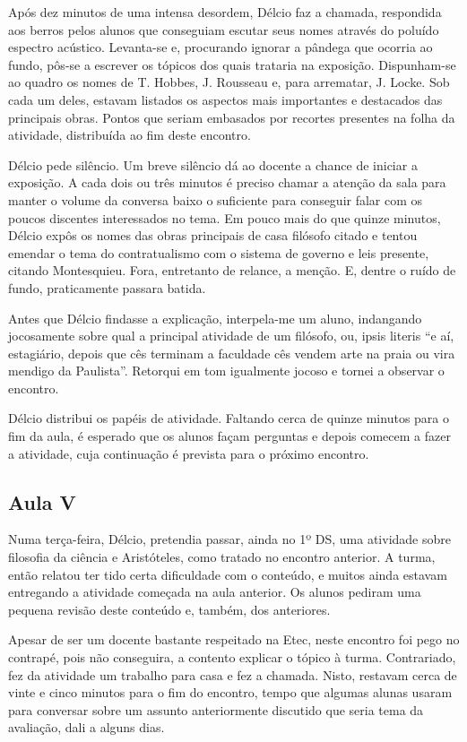 \documentclass[12pt,a4paper]{article}
\begin{document}
	Após dez minutos de uma intensa desordem, Délcio faz a chamada, respondida 
	aos berros pelos alunos que conseguiam escutar seus nomes através do 
	poluído espectro acústico. Levanta-se e, procurando ignorar a pândega que 
	ocorria ao fundo, pôs-se a escrever os tópicos dos quais trataria na 
	exposição. Dispunham-se ao quadro os nomes de T. Hobbes, J. Rousseau e, 
	para arrematar, J. Locke. Sob cada um deles, estavam listados os aspectos 
	mais importantes e destacados das principais obras. Pontos que seriam 
	embasados por recortes presentes na folha da atividade, distribuída ao 
	fim deste encontro. 
	
	Délcio pede silêncio. Um breve silêncio dá ao docente a chance de iniciar 
	a exposição. A cada dois ou três minutos é preciso chamar a atenção da 
	sala para manter o volume da conversa baixo o suficiente para conseguir 
	falar com os poucos discentes interessados no tema. Em pouco mais do que 
	quinze minutos, Délcio expôs os nomes das obras principais de casa 
	filósofo citado e tentou emendar o tema do contratualismo com o sistema 
	de governo e leis presente, citando Montesquieu. Fora, entretanto de 
	relance, a menção. E, dentre o ruído de fundo, praticamente 
	passara batida. 
	
	Antes que Délcio findasse a explicação, interpela-me um aluno, indangando 
	jocosamente sobre qual a principal atividade de um filósofo, ou, ipsis 
	literis ``e aí, estagiário, depois que cês terminam a faculdade cês vendem 
	arte na praia ou vira mendigo da Paulista''. Retorqui em tom igualmente 
	jocoso e tornei a observar o encontro. 
	
	Délcio distribui os papéis de atividade. Faltando cerca de quinze minutos 
	para o fim da aula, é esperado que os alunos façam perguntas e depois 
	comecem a fazer a atividade, cuja continuação é prevista para o próximo 
	encontro. 
	
	\subsection*{Aula V}
	
	Numa terça-feira, Délcio, pretendia passar, ainda no 1º DS, uma atividade 
	sobre filosofia da ciência e Aristóteles, como tratado no encontro 
	anterior. A turma, então relatou ter tido certa dificuldade com o conteúdo, 
	e muitos ainda estavam entregando a atividade começada na aula anterior. 
	Os alunos pediram uma pequena revisão deste conteúdo e, também, dos 
	anteriores.  
	
	Apesar de ser um docente bastante respeitado na Etec, neste encontro foi 
	pego no contrapé, pois não conseguira, a contento explicar o tópico à 
	turma. Contrariado, fez da atividade um trabalho para casa e fez a chamada. 
	Nisto, restavam cerca de vinte e cinco minutos para o fim do encontro, 
	tempo que algumas alunas usaram para conversar sobre um assunto 
	anteriormente discutido que seria tema da avaliação, dali a alguns dias. 
	
\end{document}
